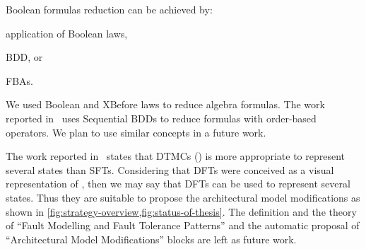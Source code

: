 \documentclass[12pt,openright,twoside,a4paper,oldfontcommands,english,brazil,final]{abntex2}
\theoremstyle{theo}
\begin{document}
Boolean formulas reduction can be achieved by:
\begin{alineasinline}
  \item application of Boolean laws,
  \item \ac{BDD}, or
  \item \acp{FBA}.
\end{alineasinline}
We used Boolean and \ac{XBefore} laws to reduce \ac{algebra} formulas.
%
The work reported in~\cite{TXD2011,XTD2012} uses Sequential BDDs to reduce formulas with order-based operators.
%
We plan to use similar concepts in a future work.

The work reported in~\cite{SAE1996b} states that \acp{DTMC} () is more appropriate to represent several states than \acp{SFT}.
Considering that \acp{DFT} were conceived as a visual representation of , then we may say that \acp{DFT} can be used to represent several states.
Thus they are suitable to propose the architectural model modifications as shown in \cref{fig:strategy-overview,fig:status-of-thesis}.
The definition and the theory of ``Fault Modelling and Fault Tolerance Patterns'' and the automatic proposal of ``Architectural Model Modifications'' blocks are left as future work.


\postextual
  

\end{document}
